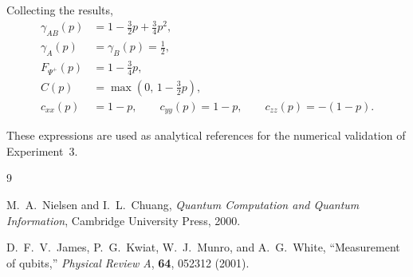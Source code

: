 \documentclass[a4paper]{article}
\begin{document}
Collecting the results,
\[
\boxed{
\begin{aligned}
\gamma_{AB}(p) &= 1-\frac{3}{2}p+\frac{3}{4}p^2, \\
\gamma_A(p) &= \gamma_B(p)=\frac12, \\
F_{\Psi^+}(p) &= 1-\frac34 p, \\
C(p) &= \max\left(0,\,1-\frac32 p\right), \\
c_{xx}(p) &= 1-p,\qquad
c_{yy}(p)=1-p,\qquad
c_{zz}(p)=-(1-p).
\end{aligned}
}
\]

These expressions are used as analytical references for the numerical validation of Experiment~3.



\begin{thebibliography}{9}

M.~A.~Nielsen and I.~L.~Chuang,  
\textit{Quantum Computation and Quantum Information},  
Cambridge University Press, 2000.

D.~F.~V.~James, P.~G.~Kwiat, W.~J.~Munro, and A.~G.~White,  
``Measurement of qubits,''  
\textit{Physical Review A}, \textbf{64}, 052312 (2001).

\end{thebibliography}
\end{document}
